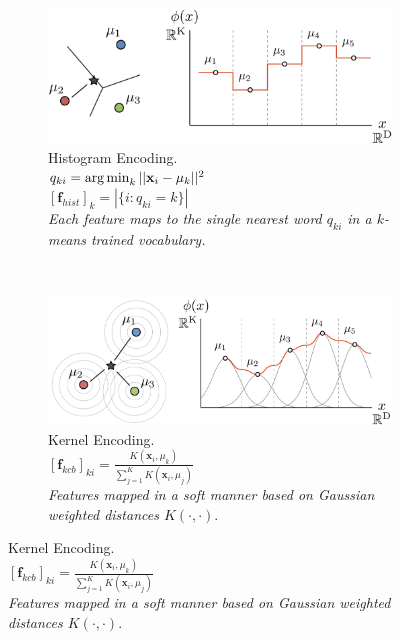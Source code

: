 \begin{figure}
    \centering
    \begin{subfigure}[b]{0.45\textwidth}
        \centering
        \includegraphics[width=\textwidth]{EncHistNT3}
        \caption{Histogram Encoding.\\
        $q_{ki} = \operatorname*{arg\,min}_k || \mathbf{x}_i - \mu_k||^2$\\
        $[\mathbf{f}_{hist}]_k =|\{i:q_{ki} = k\}|$\\
        \emph{Each feature maps to the single nearest word $q_{ki}$ in a $k$-means trained vocabulary.}}
        \label{fig:enchist}
    \end{subfigure}
    ~
    \begin{subfigure}[b]{0.45\textwidth}
        \centering
        \includegraphics[width=\textwidth]{EncKernNT3}
        \caption{Kernel Encoding.\\
        $[\mathbf{f}_{kcb}]_{ki} = \frac{ K(\mathbf{x}_i, \mu_k) }{ \sum_{ j=1 }^{ K } K(\mathbf{x}_i, \mu_j)}$\\
        \emph{Features mapped in a soft manner based on Gaussian weighted distances $K(\cdot,\cdot)$}.}
        \label{fig:enckern}
    \end{subfigure}
    

\end{figure}
